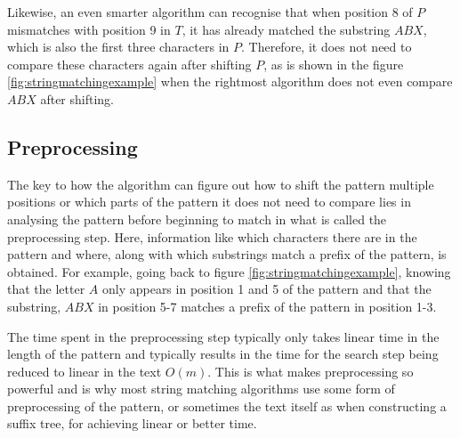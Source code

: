 Likewise, an even smarter algorithm can recognise that when position 8 of $P$ mismatches with position 9 in $T$, it has already matched the substring $ABX$, which is also the first three characters in $P$. Therefore, it does not need to compare these characters again after shifting $P$, as is shown in the figure \ref{fig:stringmatchingexample} when the rightmost algorithm does not even compare $ABX$ after shifting. 

\subsection{Preprocessing}
The key to how the algorithm can figure out how to shift the pattern multiple positions or which parts of the pattern it does not need to compare lies in analysing the pattern before beginning to match in what is called the preprocessing step. Here, information like which characters there are in the pattern and where, along with which substrings match a prefix of the pattern, is obtained. For example, going back to figure \ref{fig:stringmatchingexample}, knowing that the letter $A$ only appears in position 1 and 5 of the pattern and that the substring, $ABX$ in position 5-7 matches a prefix of the pattern in position 1-3. 

The time spent in the preprocessing step typically only takes linear time in the length of the pattern and typically results in the time for the search step being reduced to linear in the text $O(m)$. This is what makes preprocessing so powerful and is why most string matching algorithms use some form of preprocessing of the pattern, or sometimes the text itself as when constructing a suffix tree, for achieving linear or better time. 

